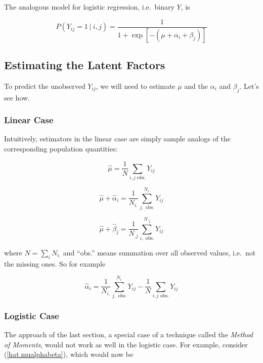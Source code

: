 The analogous model for logistic regression, i.e.\ binary $Y$, is

\begin{equation}
P(Y_{ij} = 1 ~|~ i,j) = 
\frac{1}{1 + \exp[-(\mu + \alpha_i + \beta_j)]}
\end{equation}

\subsection{Estimating the Latent Factors}

To predict the unobserved $Y_{ij}$, we will need to estimate $\mu$ and
the $\alpha_i$ and $\beta_j$.  Let's see how.

\subsubsection{Linear Case}

Intuitively, estimators in the linear case are simply sample analogs of
the corresponding population quantities:

\begin{equation}
\widehat{\mu} = \frac{1}{N} \sum_{i,j \textrm{ obs.}} Y_{ij}
\end{equation}

\begin{equation}
\label{hat.mualphabeta}
\widehat{\mu} + \widehat{\alpha}_i = \frac{1}{N_{i.}}
\sum_{j, \textrm{ obs.}}^{N_{i.}} Y_{ij}
\end{equation}

\begin{equation}
\widehat{\mu} + \widehat{\beta}_j = \frac{1}{N_{.j}}
\sum_{i, \textrm{ obs.}}^{N_{.j}} Y_{ij}
\end{equation}

where $N = \sum_{i} N_{i.}$ and ``obs.'' means summation over all
observed values, i.e.\ not the missing ones.  So for example 

\begin{equation}
\widehat{\alpha}_i = \frac{1}{N_{i.}} 
\sum_{j, \textrm{ obs.}}^{N_{i.}} Y_{ij}
- \frac{1}{N} \sum_{i,j \textrm{ obs.}} Y_{ij}
\end{equation}


\subsubsection{Logistic Case}

The approach of the last section, a special case of a technique called
the \textit{Method of Moments}, would not work as well in the logistic
case.  For example, consider (\ref{hat.mualphabeta}), which would now be

